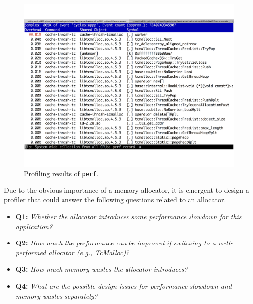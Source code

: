 \begin{figure}[!ht]
\centering
\includegraphics[width=0.9\columnwidth]{figures/perf-cache-thrash-tcmalloc}
\caption{Profiling results of \texttt{perf}. \label{fig:mot1}}
\end{figure}


Due to the obvious importance of a memory allocator, it is emergent to design a profiler that could answer the following questions related to an allocator. \\

\begin{itemize}
\item \textbf{Q1:} \textit{Whether the allocator introduces some performance slowdown for this application? }
\item \textbf{Q2:} \textit{How much the performance can be improved if switching to a well-performed allocator (e.g., TcMalloc)?}
\item \textbf{Q3:} \textit{How much memory wastes the allocator introduces?}
\item \textbf{Q4:} \textit{What are the possible design issues for performance slowdown and memory wastes separately?} 
\end{itemize}
\vspace{0.1in}

